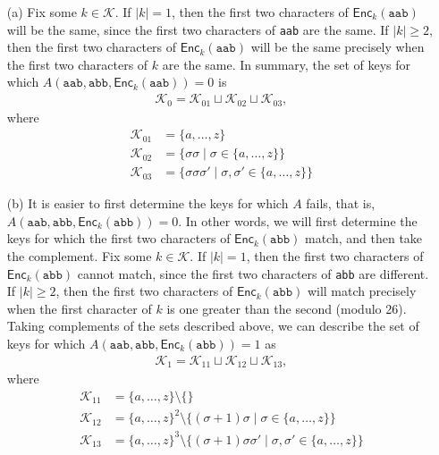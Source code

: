 \documentclass[12pt]{article}
\numberwithin{equation}{section}
\theoremstyle{plain}
\newcommand{\set}[1]{\{ #1 \}}
\newcommand{\keys}{\mathcal{K}}
\newcommand{\algo}[1]{\mathsf{#1}}
\newcommand{\enc}{\algo{Enc}}
\begin{document}
\begin{enumerate}
    \item[(a)] Fix some $k \in \keys$.
    If $|k| = 1$,
    then the first two characters of $\enc_{k}(\texttt{aab})$ will be the same,
    since the first two characters of \texttt{aab} are the same.
    If $|k| \geq 2$,
    then the first two characters of $\enc_{k}(\texttt{aab})$ will be the same
    precisely when the first two characters of $k$ are the same.
    In summary, the set of keys for which $A(\texttt{aab}, \texttt{abb}, \enc_{k}(\texttt{aab})) = 0$ is
    \begin{gather*}
        \keys_0 = \keys_{01} \sqcup \keys_{02} \sqcup \keys_{03},
    \end{gather*}
    where
    \begin{align*}
        \keys_{01} &= \set{ a, \ldots, z }\\
        \keys_{02} &= \set{ \sigma \sigma \mid \sigma \in \set{ a, \ldots, z } }\\
        \keys_{03} &= \set{ \sigma \sigma \sigma' \mid \sigma, \sigma' \in \set{ a, \ldots, z } }
    \end{align*}

    \item[(b)] It is easier to first determine the keys for which $A$ fails,
    that is, $A(\texttt{aab}, \texttt{abb}, \enc_{k}(\texttt{abb})) = 0$.
    In other words, we will first determine the keys for which
    the first two characters of $\enc_{k}(\texttt{abb})$ match,
    and then take the complement.
    Fix some $k \in \keys$.
    If $|k| = 1$,
    then the first two characters of $\enc_{k}(\texttt{abb})$ cannot match,
    since the first two characters of \texttt{abb} are different.
    If $|k| \geq 2$,
    then the first two characters of $\enc_{k}(\texttt{abb})$ will match
    precisely when the first character of $k$ is one greater than the second (modulo 26).
    Taking complements of the sets described above,
    we can describe the set of keys for which $A(\texttt{aab}, \texttt{abb}, \enc_{k}(\texttt{abb})) = 1$ as
    \begin{gather*}
        \keys_1 = \keys_{11} \sqcup \keys_{12} \sqcup \keys_{13},
    \end{gather*}
    where
    \begin{align*}
        \keys_{11} &= \set{ a, \ldots, z } \setminus \set{ }\\
        \keys_{12} &= \set{ a, \ldots, z }^2 \setminus \set{ (\sigma+1)\sigma \mid \sigma \in \set{ a, \ldots, z } }\\
        \keys_{13} &= \set{ a, \ldots, z }^3 \setminus \set{ (\sigma+1)\sigma \sigma' \mid \sigma, \sigma' \in \set{ a, \ldots, z } }
    \end{align*}
\end{enumerate}
\end{document}
